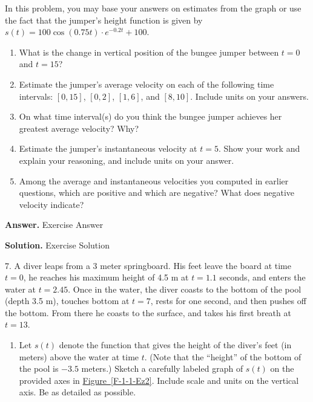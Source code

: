 \documentclass[10pt,]{book}
\theoremstyle{plain}
\theoremstyle{definition}
\theoremstyle{definition}
\theoremstyle{definition}
\theoremstyle{definition}
\theoremstyle{definition}
\numberwithin{equation}{section}
\begin{document}
\begin{exerciselist}
            In this problem, you may base your answers on estimates from the graph or use the fact that the jumper's height function is given by \(s(t) = 100\cos(0.75t) \cdot e^{-0.2t}+100\).
\leavevmode%
\begin{enumerate}[label=\alph*]
\item\hypertarget{li-24}{}What is the change in vertical position of the bungee jumper between \(t=0\) and \(t=15\)?%
\item\hypertarget{li-25}{}Estimate the jumper's average velocity on each of the following time intervals:  \([0,15]\), \([0,2]\), \([1,6]\), and \([8,10]\).  Include units on your answers.%
\item\hypertarget{li-26}{}On what time interval(s) do you think the bungee jumper achieves her greatest average velocity?  Why?%
\item\hypertarget{li-27}{}Estimate the jumper's instantaneous velocity at \(t=5\).  Show your work and explain your reasoning, and include units on your answer.%
\item\hypertarget{li-28}{}Among the average and instantaneous velocities you computed in earlier questions, which are positive and which are negative?  What does negative velocity indicate?%
\end{enumerate}
\par\smallskip
\par\smallskip
\noindent\textbf{Answer.}\hypertarget{answer-4}{}\quad
Exercise Answer%
\par\smallskip
\noindent\textbf{Solution.}\hypertarget{solution-5}{}\quad
Exercise Solution%
\item[7.]\hypertarget{ez-1-1-Diver}{}
            A diver leaps from a 3 meter springboard. His feet leave the board at time \(t=0\), he reaches his maximum height of 4.5 m at \(t = 1.1\) seconds, and enters the water at \(t = 2.45\). Once in the water, the diver coasts to the bottom of the pool (depth 3.5 m), touches bottom at \(t=7\), rests for one second, and then pushes off the bottom. From there he coasts to the surface, and takes his first breath at \(t=13\).
\leavevmode%
\begin{enumerate}[label=\alph*]
\item\hypertarget{li-29}{}Let \(s(t)\) denote the function that gives the height of the diver's feet (in meters) above the water at time \(t\).  (Note that the ``height'' of the bottom of the pool is \(-3.5\) meters.)  Sketch a carefully labeled graph of \(s(t)\) on the provided axes in \hyperref[F-1-1-Ez2]{Figure~\ref{F-1-1-Ez2}}.  Include scale and units on the vertical axis.  Be as detailed as possible.%

\end{enumerate}
\end{exerciselist}
\end{document}

